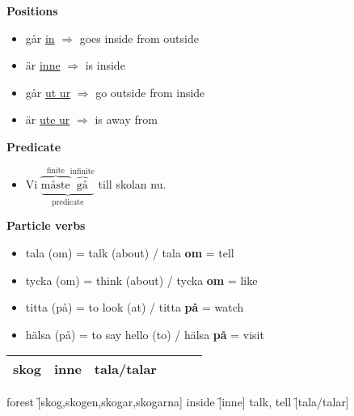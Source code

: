 
\begin{flushleft}
    \textbf{Positions}
    \begin{itemize}
        \item går \underline{in} $\Rightarrow$ goes inside from outside
        \item är \underline{inne} $\Rightarrow$ is inside
        \item går \underline{\underline{ut} ur} $\Rightarrow$ go outside from inside
        \item är \underline{\underline{ute} ur} $\Rightarrow$ is away from
    \end{itemize}

    \textbf{Predicate}
    \begin{itemize}
        \item Vi
        $\underbrace{
            \overbrace{\text{måste}}^{\text{finite}} 
            \overbrace{\text{gå}}^{\text{infinite}}
        }_{\text{predicate}}$
        till skolan nu.
    \end{itemize}

    \textbf{Particle verbs}
    \begin{itemize}
        \item tala (om) = talk (about) / tala \textbf{om} = tell
        \item tycka (om) = think (about) / tycka \textbf{om} = like
        \item titta (på) = to look (at) / titta \textbf{på} = watch
        \item hälsa (på) = to say hello (to) / hälsa \textbf{på} = visit
    \end{itemize}
\end{flushleft}

\begin{center}
    \begin{tabular}{|c c c c c c|}
        \hline
        skog & inne & tala/talar &  &  &  \\
        \hline
    \end{tabular}
\end{center}

\begin{questions}
    \begin{multicols}{2}
        \raggedcolumns
        \question forest \f[skog,skogen,skogar,skogarna]
        \question inside \f[inne]
        \question talk, tell \f[tala/talar]
    \end{multicols}
\end{questions}